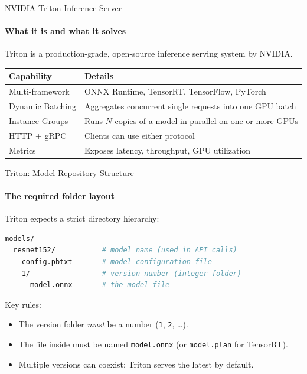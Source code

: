 \documentclass[aspectratio=169]{beamer}
\begin{document}
\begin{frame}[t]{NVIDIA Triton Inference Server}
\framesubtitle{What it is and what it solves}
Triton is a production-grade, open-source inference serving system by NVIDIA.
\vspace{2mm}
\begin{tabular}{@{}p{3.4cm}p{8.0cm}@{}}
\toprule
Capability & Details \\
\midrule
Multi-framework & ONNX Runtime, TensorRT, TensorFlow, PyTorch \\
Dynamic Batching & Aggregates concurrent single requests into one GPU batch \\
Instance Groups & Runs $N$ copies of a model in parallel on one or more GPUs \\
HTTP + gRPC & Clients can use either protocol \\
Metrics & Exposes latency, throughput, GPU utilization\\
\bottomrule
\end{tabular}
\end{frame}

\begin{frame}[t,fragile]{Triton: Model Repository Structure}
\framesubtitle{The required folder layout}
\vspace*{-0.4cm}
Triton expects a strict directory hierarchy:
\begin{lstlisting}[language=bash, basicstyle=\footnotesize\ttfamily]
models/
  resnet152/           # model name (used in API calls)
    config.pbtxt       # model configuration file
    1/                 # version number (integer folder)
      model.onnx       # the model file
\end{lstlisting}
\vspace{2mm}
Key rules:
\begin{itemize}
    \item The version folder \textit{must} be a number (\texttt{1}, \texttt{2}, \ldots).
    \item The file inside must be named \texttt{model.onnx} (or \texttt{model.plan} for TensorRT).
    \item Multiple versions can coexist; Triton serves the latest by default.
\end{itemize}
\end{frame}
\end{document}
